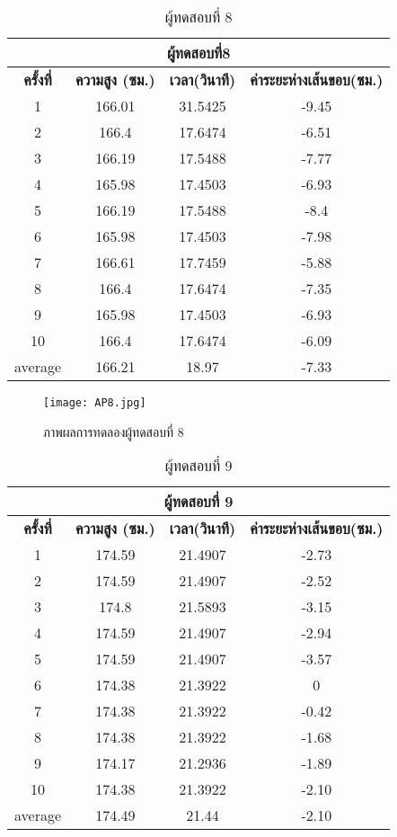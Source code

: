 \begin{table}[!hb] 
\centering
\caption{ผู้ทดสอบที่ 8}
\label{tab:8}
\begin{tabular}{|c|c|c|c|}
\hline
\multicolumn{4}{|c|}{\textbf{ผู้ทดสอบที่8}}    \\ \hline
\textbf{ครั้งที่} & \textbf{ความสูง (ซม.)} & \textbf{เวลา(วินาที)} & \textbf{ค่าระยะห่างเส้นขอบ(ซม.)}  \\ \hline
1       & 166.01 & 31.5425 & -9.45  \\ \hline
2       & 166.4  & 17.6474 & -6.51   \\ \hline
3       & 166.19 & 17.5488 & -7.77   \\ \hline
4       & 165.98 & 17.4503 & -6.93  \\ \hline
5       & 166.19 & 17.5488 & -8.4   \\ \hline
6       & 165.98 & 17.4503 & -7.98  \\ \hline
7       & 166.61 & 17.7459 & -5.88  \\ \hline
8       & 166.4  & 17.6474 & -7.35  \\ \hline
9       & 165.98 & 17.4503 & -6.93    \\ \hline
10      & 166.4  & 17.6474 & -6.09  \\ \hline
average & 166.21 & 18.97   & -7.33      \\ \hline
\end{tabular}
\end{table}

\begin{figure}[!ht]
\centering
\texttt{[image: AP8.jpg]}
\caption{ภาพผลการทดลองผู้ทดสอบที่ 8 }
\label{fig:AP8.jpg}
\end{figure}

\begin{table}[!hb] 
\centering
\caption{ผู้ทดสอบที่ 9}
\label{tab:9}
\begin{tabular}{|c|c|c|c|}
\hline
\multicolumn{4}{|c|}{\textbf{ผู้ทดสอบที่ 9}}    \\ \hline
\textbf{ครั้งที่} & \textbf{ความสูง (ซม.)} & \textbf{เวลา(วินาที)} & \textbf{ค่าระยะห่างเส้นขอบ(ซม.)}  \\ \hline
1       & 174.59 & 21.4907 & -2.73   \\ \hline
2       & 174.59 & 21.4907 & -2.52    \\ \hline
3       & 174.8  & 21.5893 & -3.15   \\ \hline
4       & 174.59 & 21.4907 & -2.94       \\ \hline
5       & 174.59 & 21.4907 & -3.57   \\ \hline
6       & 174.38 & 21.3922 & 0      \\ \hline
7       & 174.38 & 21.3922 & -0.42    \\ \hline
8       & 174.38 & 21.3922 & -1.68  \\ \hline
9       & 174.17 & 21.2936 & -1.89     \\ \hline
10      & 174.38 & 21.3922 & -2.10      \\ \hline
average & 174.49 & 21.44   & -2.10    \\ \hline
\end{tabular}
\end{table}

